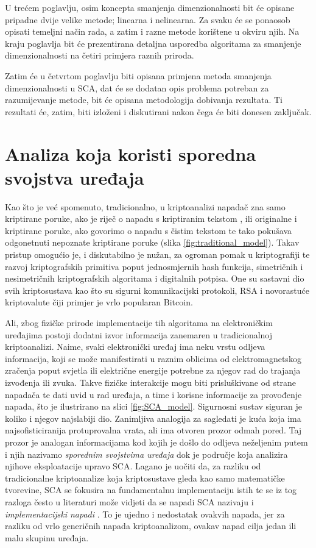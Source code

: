 \documentclass[times, utf8, diplomski]{fer}
\begin{document}
U trećem poglavlju, osim koncepta smanjenja dimenzionalnosti bit će opisane pripadne dvije velike metode; linearna i nelinearna. Za svaku će se ponaosob opisati temeljni način rada, a zatim i razne metode korištene u okviru njih. Na kraju poglavlja bit će prezentirana detaljna usporedba algoritama za smanjenje dimenzionalnosti na četiri primjera raznih priroda.

Zatim će u četvrtom poglavlju biti opisana primjena metoda smanjenja dimenzionalnosti u SCA, dat će se dodatan opis problema potreban za razumijevanje metode, bit će opisana metodologija dobivanja rezultata. Ti rezultati će, zatim, biti izloženi i diskutirani nakon čega će biti donesen zaključak.

\chapter{Analiza koja koristi sporedna svojstva uređaja}

Kao što je već spomenuto, tradicionalno, u kriptoanalizi napadač  zna samo kriptirane poruke, ako je riječ o napadu s kriptiranim tekstom , ili originalne i kriptirane poruke, ako govorimo o napadu s čistim tekstom  te tako pokušava odgonetnuti nepoznate kriptirane poruke (slika \ref{fig:traditional_model}). Takav pristup omogućio je, i diskutabilno je nužan, za ogroman pomak u kriptografiji te razvoj kriptografskih primitiva poput jednosmjernih hash funkcija, simetričnih i nesimetričnih kriptografskih algoritama i digitalnih potpisa. One su sastavni dio svih kriptosustava kao što su sigurni komunikacijski protokoli, RSA i novorastuće kriptovalute čiji primjer je vrlo popularan Bitcoin.

Ali, zbog fizičke prirode implementacije tih algoritama na elektroničkim uređajima postoji dodatni izvor informacija zanemaren u tradicionalnoj kriptoanalizi. Naime, svaki elektronički uređaj ima neku vrstu odljeva informacija, koji se može manifestirati u raznim oblicima od elektromagnetskog zračenja poput svjetla ili električne energije potrebne za njegov rad do trajanja izvođenja ili zvuka. Takve fizičke interakcije mogu biti prisluškivane od strane napadača te dati uvid u rad uređaja, a time i korisne informacije za provođenje napada, što je ilustrirano na slici \ref{fig:SCA_model}. Sigurnosni sustav siguran je koliko i njegov najslabiji dio. Zanimljiva analogija za sagledati je kuća koja ima najsofisticiranija protuprovalna vrata, ali ima otvoren prozor odmah pored. Taj prozor je analogan informacijama kod kojih je došlo do odljeva neželjenim putem i njih nazivamo \emph{sporednim svojstvima uređaja}  dok je područje koja analizira njihove eksploatacije upravo SCA. Lagano je uočiti da, za razliku od tradicionalne kriptoanalize koja kriptosustave gleda kao samo matematičke tvorevine, SCA se fokusira na fundamentalnu implementaciju istih te se iz tog razloga često u literaturi može vidjeti da se napadi SCA nazivaju i \emph{implementacijski napadi} . To je ujedno i nedostatak ovakvih napada, jer za razliku od vrlo generičnih napada kriptoanalizom, ovakav napad cilja jedan ili malu skupinu uređaja.
\end{document}
